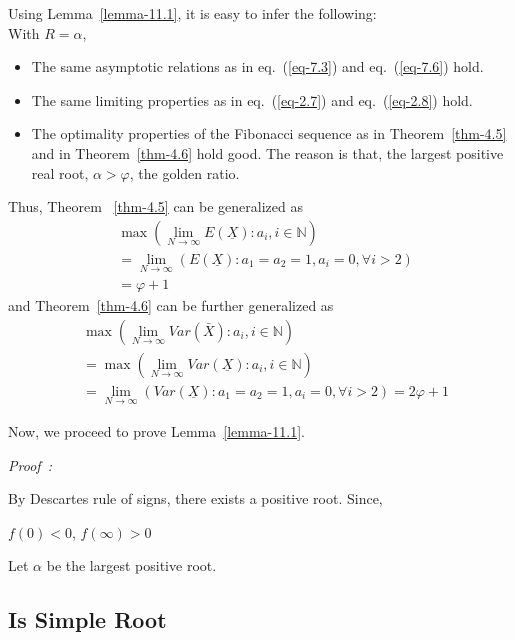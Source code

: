 \begin{multicols}{2}
Using Lemma~\ref{lemma-11.1}, it is easy to infer the following:\\
With $R = \alpha$,
\begin{itemize}
\item The same asymptotic relations as in eq.~(\ref{eq-7.3}) and eq.~(\ref{eq-7.6}) hold. 
\item The same limiting properties as in eq.~(\ref{eq-2.7}) and eq.~(\ref{eq-2.8}) hold.
\item The optimality properties of the Fibonacci sequence as in Theorem~\ref{thm-4.5} and in Theorem~\ref{thm-4.6} hold good. The reason is that, the largest positive real root, $\alpha > \varphi$, the golden ratio.
\end{itemize}
Thus, Theorem ~\ref{thm-4.5} can be generalized as 
\begin{align*}
&\max{\left(\lim_{N\rightarrow \infty} E(\underline{X}): a_i, i \in \mathbb N \right)}\\
 &= \lim_{N \rightarrow \infty}\left(E(\underline{X}):a_1 = a_2 = 1, a_{i}=0, \forall i> 2\right)\\
   &= \varphi + 1
\end{align*}
and Theorem~\ref{thm-4.6} can be further generalized as 
\begin{align*}
&\max{\left(\lim_{N\rightarrow \infty}Var(\bar{X}): a_i, i \in \mathbb N\right)}\\
&= \max{\left(\lim_{N\rightarrow \infty}Var(\underline{X}): a_i, i \in \mathbb N\right)}\\
\nonumber &= \lim_{N \rightarrow \infty}\left(Var(\underline{X}):a_1=a_2=1, a_{i}=0,\forall i > 2\right) = 2\varphi + 1
\end{align*}

Now, we proceed to prove Lemma~\ref{lemma-11.1}.

{\it Proof~:}

By Descartes rule of signs, there exists a positive root. Since, 

\vspace{-.7cm}
 \begin{center}
 $ f(0) < 0$, $f(\infty) > 0$ \\
 \end{center}

\vspace{-.3cm}

Let $\alpha$ be the largest positive root. 

\vspace{-.3cm}

\subsection{\hspace{-.3cm}{\greekfont α} Is Simple Root}\label{subsection-11.1}


\end{multicols}

